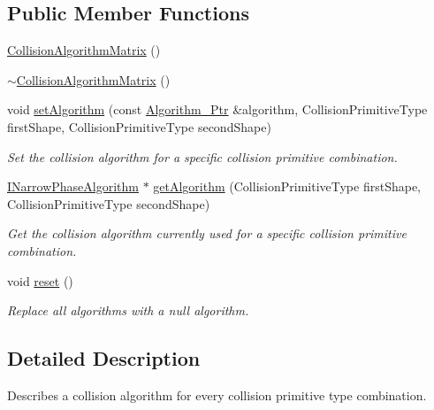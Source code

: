 \subsection*{Public Member Functions}
\begin{DoxyCompactItemize}
\item 
\mbox{\hyperlink{classr3_1_1_collision_algorithm_matrix_a97bdad626057f600ae5ffca63eb174b8}{Collision\+Algorithm\+Matrix}} ()
\item 
\mbox{\hyperlink{classr3_1_1_collision_algorithm_matrix_adea2db794d9606ecf24745ad6ac912d8}{$\sim$\+Collision\+Algorithm\+Matrix}} ()
\item 
void \mbox{\hyperlink{classr3_1_1_collision_algorithm_matrix_a05aae40f6aba106fa9e62b45fd434bad}{set\+Algorithm}} (const \mbox{\hyperlink{classr3_1_1_collision_algorithm_matrix_ae68e99a7d5f10618fa4b82ee254052b9}{Algorithm\+\_\+\+Ptr}} \&algorithm, Collision\+Primitive\+Type first\+Shape, Collision\+Primitive\+Type second\+Shape)
\begin{DoxyCompactList}\small\item\em Set the collision algorithm for a specific collision primitive combination. \end{DoxyCompactList}\item 
\mbox{\hyperlink{classr3_1_1_i_narrow_phase_algorithm}{I\+Narrow\+Phase\+Algorithm}} $\ast$ \mbox{\hyperlink{classr3_1_1_collision_algorithm_matrix_ad40e0f125b95d6bcdb2e8a27c1397e68}{get\+Algorithm}} (Collision\+Primitive\+Type first\+Shape, Collision\+Primitive\+Type second\+Shape)
\begin{DoxyCompactList}\small\item\em Get the collision algorithm currently used for a specific collision primitive combination. \end{DoxyCompactList}\item 
void \mbox{\hyperlink{classr3_1_1_collision_algorithm_matrix_af2f1a16b0e3bbede20dc8559820525cb}{reset}} ()
\begin{DoxyCompactList}\small\item\em Replace all algorithms with a null algorithm. \end{DoxyCompactList}\end{DoxyCompactItemize}


\subsection{Detailed Description}
Describes a collision algorithm for every collision primitive type combination. 


